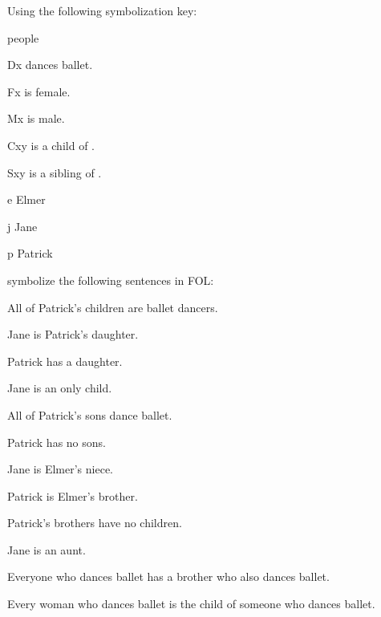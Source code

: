 \solutions
\problempart
\label{pr.FOLballet}
Using the following symbolization key:
\begin{ekey}
\item[\text{domain}] people
\item[Dx]  dances ballet.
\item[Fx]  is female.
\item[Mx]  is male.
\item[Cxy]  is a child of .
\item[Sxy]  is a sibling of .
\item[e] Elmer
\item[j] Jane
\item[p] Patrick
\end{ekey}
symbolize the following sentences in FOL:
\begin{earg}
\item All of Patrick's children are ballet dancers.
\item[] 
\item Jane is Patrick's daughter.
\item[] 
\item Patrick has a daughter.
\item[] 
\item Jane is an only child.
\item[] 
\item All of Patrick's sons dance ballet.
\item[] 
\item Patrick has no sons.
\item[] 
\item Jane is Elmer's niece.
\item[] 
\item Patrick is Elmer's brother.
\item[] 
\item Patrick's brothers have no children.
\item[] 
\item Jane is an aunt.
\item[] 
\item Everyone who dances ballet has a brother who also dances ballet.
\item[] 
\item Every woman who dances ballet is the child of someone who dances ballet.
\item[] 
\end{earg}


